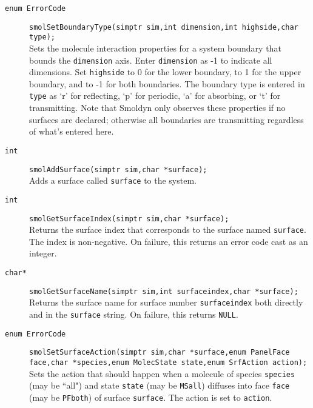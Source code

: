 \documentclass {book}
\begin{document}
\begin{description}

\item[\texttt{enum ErrorCode}]
\texttt{smolSetBoundaryType(simptr sim,int dimension,int highside,char type);}
\hfill \\
Sets the molecule interaction properties for a system boundary that bounds the \texttt{dimension} axis.  Enter \texttt{dimension} as -1 to indicate all dimensions.  Set \texttt{highside} to 0 for the lower boundary, to 1 for the upper boundary, and to -1 for both boundaries.  The boundary type is entered in \texttt{type} as `r' for reflecting, `p' for periodic, `a' for absorbing, or `t' for transmitting.  Note that Smoldyn only observes these properties if no surfaces are declared; otherwise all boundaries are transmitting regardless of what's entered here.

\item[\texttt{int}]
\texttt{smolAddSurface(simptr sim,char *surface);}
\hfill \\
Adds a surface called \texttt{surface} to the system.

\item[\texttt{int}]
\texttt{smolGetSurfaceIndex(simptr sim,char *surface);}
\hfill \\
Returns the surface index that corresponds to the surface named \texttt{surface}.  The index is non-negative.  On failure, this returns an error code cast as an integer.

\item[\texttt{char*}]
\texttt{smolGetSurfaceName(simptr sim,int surfaceindex,char *surface);}
\hfill \\
Returns the surface name for surface number \texttt{surfaceindex} both directly and in the \texttt{surface} string.  On failure, this returns \texttt{NULL}.

\item[\texttt{enum ErrorCode}]
\texttt{smolSetSurfaceAction(simptr sim,char *surface,enum PanelFace face,char *species,enum MolecState state,enum SrfAction action);}
\hfill \\
Sets the action that should happen when a molecule of species \texttt{species} (may be ``all") and state \texttt{state} (may be \texttt{MSall}) diffuses into face \texttt{face} (may be \texttt{PFboth}) of surface \texttt{surface}.  The action is set to \texttt{action}.


\end{description}
\end{document}
